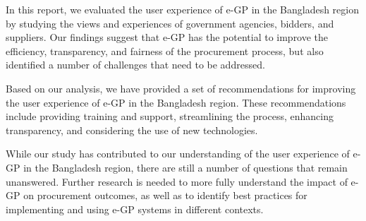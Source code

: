 \documentclass{report}
\begin{document}
In this report, we evaluated the user experience of e-GP in the Bangladesh region by studying the views and experiences of government agencies, bidders, and suppliers. Our findings suggest that e-GP has the potential to improve the efficiency, transparency, and fairness of the procurement process, but also identified a number of challenges that need to be addressed.

Based on our analysis, we have provided a set of recommendations for improving the user experience of e-GP in the Bangladesh region. These recommendations include providing training and support, streamlining the process, enhancing transparency, and considering the use of new technologies.

While our study has contributed to our understanding of the user experience of e-GP in the Bangladesh region, there are still a number of questions that remain unanswered. Further research is needed to more fully understand the impact of e-GP on procurement outcomes, as well as to identify best practices for implementing and using e-GP systems in different contexts.


\end{document}
